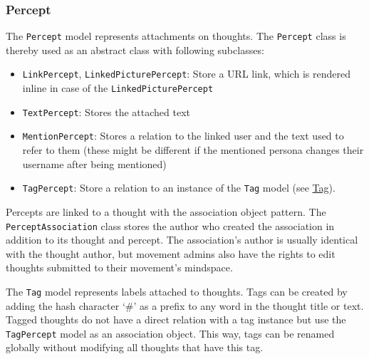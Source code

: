 \subsubsection{Percept}\label{percept}

The \texttt{Percept} model represents attachments on thoughts. The
\texttt{Percept} class is thereby used as an abstract class with
following subclasses:

\begin{itemize}
\tightlist
\item
  \texttt{LinkPercept}, \texttt{LinkedPicturePercept}: Store a URL link,
  which is rendered inline in case of the \texttt{LinkedPicturePercept}
\item
  \texttt{TextPercept}: Stores the attached text
\item
  \texttt{MentionPercept}: Stores a relation to the linked user and the
  text used to refer to them (these might be different if the mentioned
  persona changes their username after being mentioned)
\item
  \texttt{TagPercept}: Store a relation to an instance of the
  \texttt{Tag} model (see \hyperref[tag]{Tag}).
\end{itemize}

Percepts are linked to a thought with the association object pattern.
The \texttt{PerceptAssociation} class stores the author who created the
association in addition to its thought and percept. The association's
author is usually identical with the thought author, but movement admins
also have the rights to edit thoughts submitted to their movement's
mindspace.


The \texttt{Tag} model represents labels attached to thoughts. Tags can
be created by adding the hash character `\#' as a prefix to any word in
the thought title or text. Tagged thoughts do not have a direct relation
with a tag instance but use the \texttt{TagPercept} model as an
association object. This way, tags can be renamed globally without
modifying all thoughts that have this tag.


